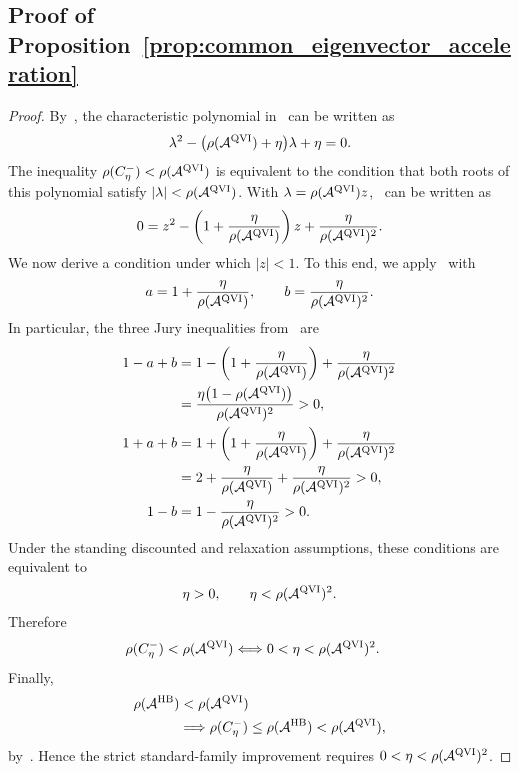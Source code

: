 \documentclass[letterpaper]{article}
\numberwithin{equation}{section}
\begin{document}
\subsection{Proof of Proposition~\ref{prop:common_eigenvector_acceleration}}
\label{app:proof-prop-common-eigenvector-acceleration}

\begin{proof}
By~, the characteristic polynomial in~ can be written as
\begin{align}
  \lambda^2-\bigl(\rho(\mathcal A^{\rm QVI})+\eta\bigr)\lambda+\eta=0.\label{eq:hb-scaled-characteristic}
\end{align}
The inequality $\rho(C_\eta^-)<\rho(\mathcal A^{\rm QVI})$ is equivalent to the
condition that both roots of this polynomial satisfy
$|\lambda|<\rho(\mathcal A^{\rm QVI})$. With
$\lambda=\rho(\mathcal A^{\rm QVI})z$,~ can be written as
\begin{align*}
0=z^2- \left(1+\frac{\eta}{\rho(\mathcal A^{\rm QVI})}\right)z
    +\frac{\eta}{\rho(\mathcal A^{\rm QVI})^2}.
\end{align*}
We now derive a condition under which $|z|<1$.
To this end, we apply~ with
\begin{align*}
  a=1+\frac{\eta}{\rho(\mathcal A^{\rm QVI})},
  \qquad
  b=\frac{\eta}{\rho(\mathcal A^{\rm QVI})^2}.
\end{align*}
In particular, the three Jury inequalities from~ are
\begin{align*}
  1-a+b
  &=1-
    \left(1+\frac{\eta}{\rho(\mathcal A^{\rm QVI})}\right)
    +\frac{\eta}{\rho(\mathcal A^{\rm QVI})^2}\\
  &=\frac{\eta\bigl(1-\rho(\mathcal A^{\rm QVI})\bigr)}
    {\rho(\mathcal A^{\rm QVI})^2}>0,\\
  1+a+b
  &=1+
    \left(1+\frac{\eta}{\rho(\mathcal A^{\rm QVI})}\right)
    +\frac{\eta}{\rho(\mathcal A^{\rm QVI})^2}\\
  &=2+\frac{\eta}{\rho(\mathcal A^{\rm QVI})}
    +\frac{\eta}{\rho(\mathcal A^{\rm QVI})^2}>0,\\
  1-b
  &=1-\frac{\eta}{\rho(\mathcal A^{\rm QVI})^2}>0.
\end{align*}
Under the standing discounted and relaxation assumptions, these conditions are equivalent to
\begin{align*}
  \eta>0,
  \qquad
  \eta<\rho(\mathcal A^{\rm QVI})^2.
\end{align*}
Therefore
\begin{align*}
  \rho(C_\eta^-)<\rho(\mathcal A^{\rm QVI})
  &\Longleftrightarrow
  0<\eta<\rho(\mathcal A^{\rm QVI})^2.
\end{align*}
Finally,
\begin{align*}
\rho(\mathcal A^{\rm HB})&<\rho(\mathcal A^{\rm QVI})\\
&\Longrightarrow
  \rho(C_\eta^-)\le\rho(\mathcal A^{\rm HB})<\rho(\mathcal A^{\rm QVI}),
\end{align*}
by~. Hence the strict
standard-family improvement requires $0<\eta<\rho(\mathcal A^{\rm QVI})^2$.
\end{proof}
\end{document}
